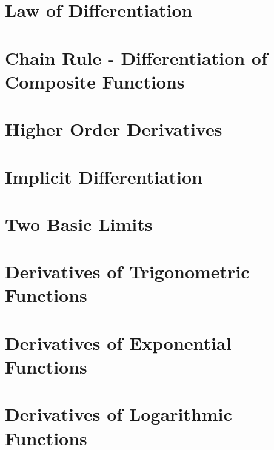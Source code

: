 \documentclass[12pt]{report}
\begin{document}
\section{Law of Differentiation}

\section{Chain Rule - Differentiation of Composite Functions}

\section{Higher Order Derivatives}

\section{Implicit Differentiation}

\section{Two Basic Limits}

\section{Derivatives of Trigonometric Functions}

\section{Derivatives of Exponential Functions}

\section{Derivatives of Logarithmic Functions}
\end{document}
